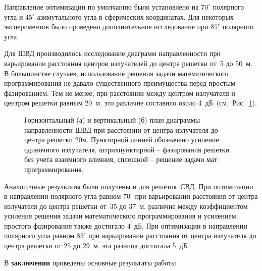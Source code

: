 Направление оптимизации по умолчанию было установлено на $70^{\circ}$ полярного угла и $45^{\circ}$ азимутального угла в сферических координатах. Для некоторых экспериментов было проведено дополнительное исследование при $85^{\circ}$ полярного угла.


Для ШВД производилось исследование диаграмм направленности при варьировании расстояния центров излучателей до центра решетки от~5 до 50~м. В большинстве случаев, использование решения задачи математического программирования не давало существенного преимущества перед простым фазированием. Тем не менее, при расстоянии между центром излучателя и центром решетки равным 20~м. это различие составило около 4~дБ~(см.~Рис.~\ref{pic:r_bvd_result_0}).

\begin{figure}
\begin{minipage}[h]{0.49\linewidth}
\end{minipage}
\hfill
\begin{minipage}[h]{0.49\linewidth}
\end{minipage}
\caption{Горизонтальный (а) и вертикальный (б) план диаграммы направленности ШВД при расстоянии от центра излучателя до центра решетки 20м. Пунктирной линией обозначено усиление одиночного излучателя, штрихпунктирной – фазирования решетки без учета взаимного влияния, сплошной – решение задачи мат. программирования.}
\label{pic:r_bvd_result_0}
\end{figure}

Аналогичные результаты были получены и для решеток~СВД. При оптимизации в направлении полярного угла равном $70^{\circ}$ при варьировании расстояния от центра излучателя до центра решетки от~35 до 37~м. различие между коэффициентом усиления решения задачи математического программирования и усилением простого фазирования также достигало 4~дБ.  При оптимизации в направлении полярного угла равном $85^{\circ}$ при варьировании расстояния от центра излучателя до центра решетки от 25 до 29~м. эта разница достигала 5~дБ.

\FloatBarrier
{}                                  %
В {\textbf{заключении}} приведены основные результаты работы

